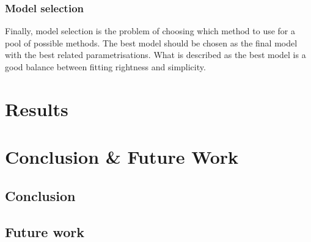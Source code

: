 \documentclass[11pt,a4paper,oneside]{book}
\begin{document}
\subsection{Model selection}

Finally, model selection is the problem of choosing which method to use for a pool of possible methods. The best model should be chosen as the final model with the best related parametrisations. What is described as the best model is a good balance between fitting rightness and simplicity. \cite{BenTaieb}




\chapter{Results}


\chapter{Conclusion \& Future Work }


\section{Conclusion}


\section{Future work}




\end{document}
